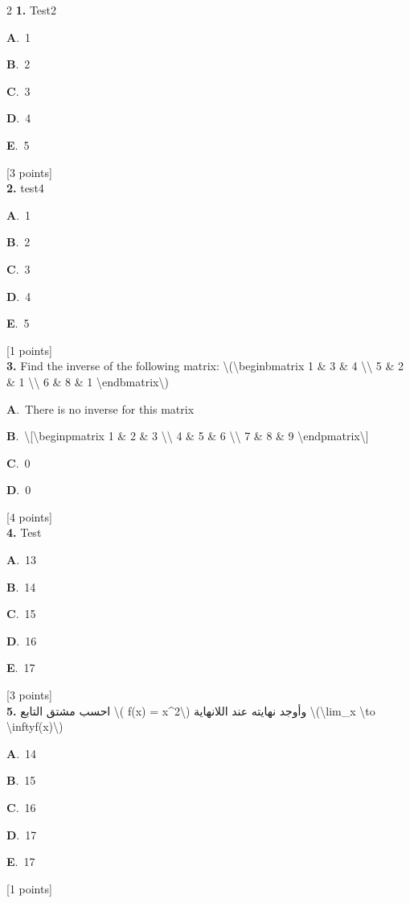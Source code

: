 \documentclass[12pt]{article}
\newcommand{\choice}[3]{%
  \noindent\textbf{#1}.~#2\hfill#3\par\vspace{0.25em}
}
\begin{document}
\begin{multicols}{2}
\noindent \textbf{\textenglish{1.}} {\textenglish{Test2}}

\noindent\choice{A}{{\textenglish{1}}}{}
\noindent\choice{B}{{\textenglish{2}}}{}
\noindent\choice{C}{{\textenglish{3}}}{}
\noindent\choice{D}{{\textenglish{4}}}{}
\noindent\choice{E}{{\textenglish{5}}}{}
\hfill {\textenglish{[3 points]}}\\[0.5em]

\noindent \textbf{\textenglish{2.}} {\textenglish{test4}}

\noindent\choice{A}{{\textenglish{1}}}{}
\noindent\choice{B}{{\textenglish{2}}}{}
\noindent\choice{C}{{\textenglish{3}}}{}
\noindent\choice{D}{{\textenglish{4}}}{}
\noindent\choice{E}{{\textenglish{5}}}{}
\hfill {\textenglish{[1 points]}}\\[0.5em]

\noindent \textbf{\textenglish{3.}} {\textenglish{Find the inverse of the following matrix: \textbackslash{}(\textbackslash{}begin{bmatrix} 1 \& 3 \& 4 \textbackslash{}\textbackslash{} 5 \& 2 \& 1 \textbackslash{}\textbackslash{} 6 \& 8 \& 1 \textbackslash{}end{bmatrix}\textbackslash{})}}

\noindent\choice{A}{{\textenglish{There is no inverse for this matrix}}}{}
\noindent\choice{B}{{\textenglish{\textbackslash{}[\textbackslash{}begin{pmatrix} 1 \& 2 \& 3 \textbackslash{}\textbackslash{} 4 \& 5 \& 6 \textbackslash{}\textbackslash{} 7 \& 8 \& 9  \textbackslash{}end{pmatrix}\textbackslash{}]}}}{}
\noindent\choice{C}{{\textenglish{0}}}{}
\noindent\choice{D}{{\textenglish{0}}}{}
\hfill {\textenglish{[4 points]}}\\[0.5em]

\noindent \textbf{\textenglish{4.}} {\textenglish{Test}}

\noindent\choice{A}{{\textenglish{13}}}{}
\noindent\choice{B}{{\textenglish{14}}}{}
\noindent\choice{C}{{\textenglish{15}}}{}
\noindent\choice{D}{{\textenglish{16}}}{}
\noindent\choice{E}{{\textenglish{17}}}{}
\hfill {\textenglish{[3 points]}}\\[0.5em]

\noindent \textbf{\textenglish{5.}} {\textarabic{احسب مشتق التابع \textbackslash{}( f(x) = x\^{}2\textbackslash{}) وأوجد نهايته عند اللانهاية \textbackslash{}(\textbackslash{}lim\_{x \textbackslash{}to \textbackslash{}infty}f(x)\textbackslash{})}}

\noindent\choice{A}{{\textenglish{14}}}{}
\noindent\choice{B}{{\textenglish{15}}}{}
\noindent\choice{C}{{\textenglish{16}}}{}
\noindent\choice{D}{{\textenglish{17}}}{}
\noindent\choice{E}{{\textenglish{17}}}{}
\hfill {\textenglish{[1 points]}}\\[0.5em]


\end{multicols}
\end{document}
